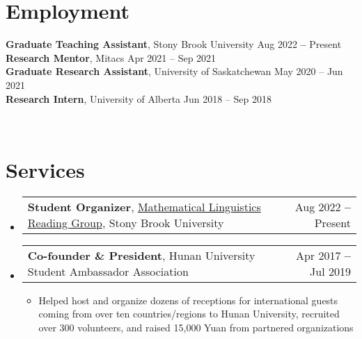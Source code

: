 \documentclass[letterpaper,11pt]{article}
\makeatletter
\newcommand{\resumeItem}[1]{
  \item\small{
    {#1 \vspace{-2pt}}
  }
}
\newcommand{\resumeProjectHeading}[2]{
    \vspace{-2pt}\item
    \begin{tabular*}{0.97\textwidth}{l@{\extracolsep{\fill}}r}
      \small#1 & #2 \\
    \end{tabular*}\vspace{-7pt}
}
\newcommand{\resumeSubHeadingListStart}{\begin{itemize}[leftmargin=0.15in, label={}]}
\newcommand{\resumeSubHeadingListEnd}{\end{itemize}}
\newcommand{\resumeItemListStart}{\begin{itemize}}
\newcommand{\resumeItemListEnd}{\end{itemize}\vspace{-5pt}}
\makeatother
\begin{document}
 

\section{Employment}
  \resumeSubHeadingListStart
       \small{\item{
        \textbf{Graduate Teaching Assistant}, Stony Brook University \hfill Aug 2022 \textbf{--} Present \\ \vspace{1pt}
        \textbf{Research Mentor}, Mitacs \hfill Apr 2021 – Sep 2021 \\ \vspace{1pt}
        \textbf{Graduate Research Assistant}, University of Saskatchewan \hfill May 2020 – Jun 2021 \\ \vspace{1pt}
        \textbf{Research Intern}, University of Alberta \hfill Jun 2018 – Sep 2018}} \\ \vspace{-5pt}
  \resumeSubHeadingListEnd
 
\vspace{1pt}


\section{Services}
    \resumeSubHeadingListStart
    \resumeProjectHeading
        {\textbf{Student Organizer}, \href{https://complab-stonybrook.github.io/mlrg/}{Mathematical Linguistics Reading Group}, Stony Brook University}{Aug 2022 \textbf{--} Present}

    \resumeProjectHeading        
    	 {\textbf{Co-founder \& President}, Hunan University Student Ambassador Association}{Apr 2017 \textbf{--} Jul 2019 }
          \resumeItemListStart
            \resumeItem{Helped host and organize dozens of receptions for international guests coming from over ten countries/regions to Hunan University, recruited over 300 volunteers, and raised 15,000 Yuan from partnered organizations}
          \resumeItemListEnd

    \resumeSubHeadingListEnd

\vspace{-10pt}

\end{document}
